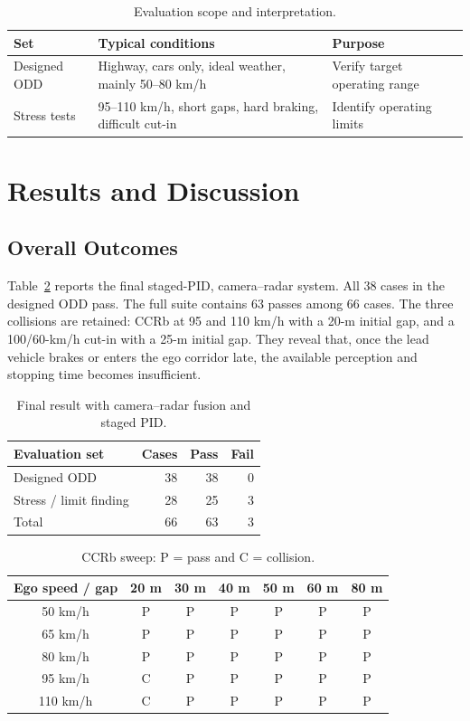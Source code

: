 \documentclass[conference]{IEEEtran}
\begin{document}
\begin{table}[t]
\caption{Evaluation scope and interpretation.}
\label{tab:scope}
\centering
\footnotesize
\begin{tabular}{p{}p{}p{}}
\toprule
Set & Typical conditions & Purpose \\
\midrule
Designed ODD & Highway, cars only, ideal weather, mainly 50--80 km/h & Verify target operating range \\
Stress tests & 95--110 km/h, short gaps, hard braking, difficult cut-in & Identify operating limits \\
\bottomrule
\end{tabular}
\end{table}

\section{Results and Discussion}
\subsection{Overall Outcomes}
Table~\ref{tab:results} reports the final staged-PID, camera--radar system.
All 38 cases in the designed ODD pass. The full suite contains 63 passes among
66 cases. The three collisions are retained: CCRb at 95 and 110 km/h with a
20-m initial gap, and a 100/60-km/h cut-in with a 25-m initial gap. They reveal
that, once the lead vehicle brakes or enters the ego corridor late, the available
perception and stopping time becomes insufficient.

\begin{table}[t]
\caption{Final result with camera--radar fusion and staged PID.}
\label{tab:results}
\centering
\footnotesize
\begin{tabular}{lrrr}
\toprule
Evaluation set & Cases & Pass & Fail \\
\midrule
Designed ODD & 38 & 38 & 0 \\
Stress / limit finding & 28 & 25 & 3 \\
\midrule
Total & 66 & 63 & 3 \\
\bottomrule
\end{tabular}
\end{table}

\begin{table}[t]
\caption{CCRb sweep: P = pass and C = collision.}
\label{tab:ccrb_sweep}
\centering
\footnotesize
\begin{tabular}{c*{6}{c}}
\toprule
Ego speed / gap & 20 m & 30 m & 40 m & 50 m & 60 m & 80 m \\
\midrule
50 km/h  & P & P & P & P & P & P \\
65 km/h  & P & P & P & P & P & P \\
80 km/h  & P & P & P & P & P & P \\
95 km/h  & C & P & P & P & P & P \\
110 km/h & C & P & P & P & P & P \\
\bottomrule
\end{tabular}
\end{table}
\end{document}
